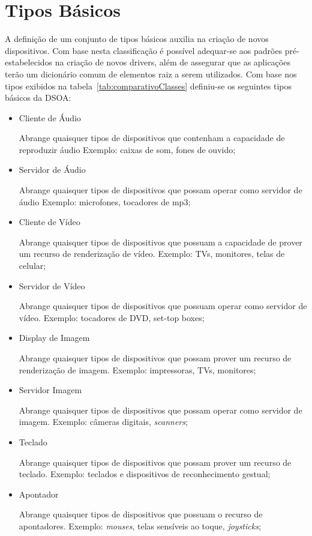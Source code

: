 \section{Tipos Básicos}
\label{sec:tiposBasicos}

A definição de um conjunto de tipos básicos auxilia na criação de novos dispositivos. Com base nesta classificação é possível adequar-se aos padrões pré-estabelecidos na criação de novos drivers, além de assegurar que as aplicações terão um dicionário comum de elementos raiz a serem utilizados. Com base nos tipos exibidos na tabela~\ref{tab:comparativoClasses} definiu-se os seguintes tipos básicos da DSOA:

\begin{itemize}
	\item Cliente de Áudio
		
		Abrange quaisquer tipos de dispositivos que contenham a capacidade de reproduzir áudio Exemplo: caixas de som, fones de ouvido;
	\item Servidor de Áudio
		
		Abrange quaisquer tipos de dispositivos que possam operar como servidor de áudio Exemplo: microfones, tocadores de mp3;
	\item Cliente de Vídeo
		
		Abrange quaisquer tipos de dispositivos que possuam a capacidade de prover um recurso de renderização de vídeo. Exemplo: TVs, monitores, telas de celular;
	\item Servidor de Vídeo
		
		Abrange quaisquer tipos de dispositivos que possuam operar como servidor de vídeo. Exemplo: tocadores de DVD, set-top boxes;
	\item Display de Imagem
		
		Abrange quaisquer tipos de dispositivos que possam prover um recurso de renderização de imagem. Exemplo: impressoras, TVs, monitores;
	\item Servidor Imagem
		
		Abrange quaisquer tipos de dispositivos que possam operar como servidor de imagem. Exemplo: câmeras digitais, \emph{scanners};
	\item Teclado
		
		Abrange quaisquer tipos de dispositivos que possam prover um recurso de teclado. Exemplo: teclados e dispositivos de reconhecimento gestual;
	\item Apontador
		
		Abrange quaisquer tipos de dispositivos que possuam o recurso de apontadores. Exemplo: \emph{mouses}, telas sensíveis ao toque, \emph{joysticks};
\end{itemize}

